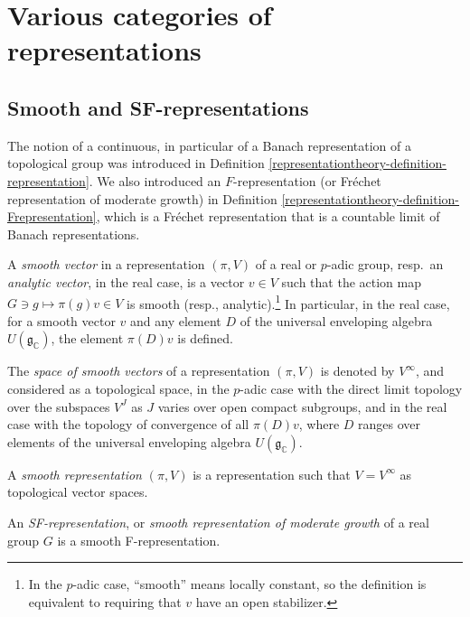 \section{Various categories of representations}
\label{section-categories-representations}

\subsection{Smooth and SF-representations}
\label{subsection-smooth-SF-representations}


The notion of a continuous, in particular of a Banach representation of a topological group was introduced in Definition \ref{representationtheory-definition-representation}. We also introduced an $F$-representation (or Fr\'echet representation of moderate growth) in Definition \ref{representationtheory-definition-Frepresentation}, which is a Fr\'echet representation that is a countable limit of Banach representations. 

\begin{definition}
 \label{definition-smooth-representation}
A {\it smooth vector} in a representation $(\pi, V)$ of a real or $p$-adic group, resp.\ an {\it analytic vector}, in the real case, is a vector $v\in V$ such that the action map $G\ni g \mapsto \pi(g) v \in V$ is smooth (resp., analytic).\footnote{In the $p$-adic case, ``smooth'' means locally constant, so the definition is equivalent to requiring that $v$ have an open stabilizer.} In particular, in the real case, for a smooth vector $v$ and any element $D$ of the universal enveloping algebra $U(\mathfrak g_{\mathbb C})$, the element $\pi(D) v$ is defined.

The {\it space of smooth vectors} of a representation $(\pi, V)$ is denoted by $V^\infty$, and considered as a topological space, in the $p$-adic case with the direct limit topology over the subspaces $V^J$ as $J$ varies over open compact subgroups, and in the real case with the topology of convergence of all $\pi(D)v$, where $D$ ranges over elements of the universal enveloping algebra $U(\mathfrak g_{\mathbb C})$. 
 
A {\it smooth representation} $(\pi, V)$ is a representation such that $V = V^\infty$ as topological vector spaces. 

An {\it SF-representation}, or {\it smooth representation of moderate growth} of a real group $G$ is a smooth F-representation. 
\end{definition}

